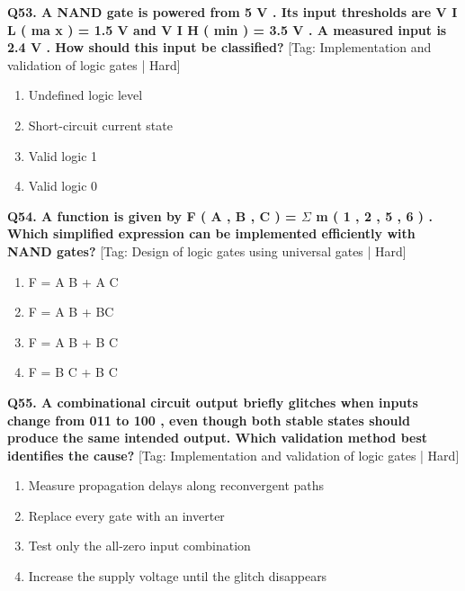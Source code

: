 \noindent\textbf{Q53. A NAND gate is powered from 5 V . Its input thresholds are V I L ( ma x ) = 1.5 V and V I H ( min ) = 3.5 V . A measured input is 2.4 V . How should this input be classified?} \hfill [Tag: Implementation and validation of logic gates | Hard]
\begin{enumerate}[label=(\alph*),topsep=2pt,itemsep=1pt,partopsep=0pt,parsep=0pt]
    \item {Undefined logic level}
    \item {Short-circuit current state}
    \item {Valid logic 1}
    \item {Valid logic 0}
\end{enumerate}
\vspace{2mm}

\noindent\textbf{Q54. A function is given by F ( A , B , C ) = $\Sigma$ m ( 1 , 2 , 5 , 6 ) . Which simplified expression can be implemented efficiently with NAND gates?} \hfill [Tag: Design of logic gates using universal gates | Hard]
\begin{enumerate}[label=(\alph*),topsep=2pt,itemsep=1pt,partopsep=0pt,parsep=0pt]
    \item {F = A B + A C}
    \item {F = A B + BC}
    \item {F = A B + B C}
    \item {F = B C + B C}
\end{enumerate}
\vspace{2mm}

\noindent\textbf{Q55. A combinational circuit output briefly glitches when inputs change from 011 to 100 , even though both stable states should produce the same intended output. Which validation method best identifies the cause?} \hfill [Tag: Implementation and validation of logic gates | Hard]
\begin{enumerate}[label=(\alph*),topsep=2pt,itemsep=1pt,partopsep=0pt,parsep=0pt]
    \item {Measure propagation delays along reconvergent paths}
    \item {Replace every gate with an inverter}
    \item {Test only the all-zero input combination}
    \item {Increase the supply voltage until the glitch disappears}
\end{enumerate}
\vspace{2mm}

